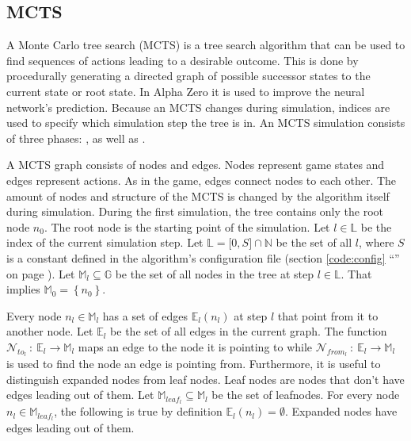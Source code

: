 \documentclass[12pt]{article}
\newcommand{\sectionref}[1]{section \ref{#1} ``\nameref{#1}'' on page \pageref{#1}}
\begin{document}
\subsection{MCTS \cite{chaslot2008parallel}\cite{silver2018general}}
A Monte Carlo tree search (MCTS) is a tree search algorithm that can be used to find sequences of actions leading to a desirable outcome. This is done by procedurally generating a directed graph of possible successor states to the current state or root state. In Alpha Zero it is used to improve the neural network's prediction.
Because an MCTS changes during simulation, indices are used to specify which simulation step the tree is in. An MCTS simulation consists of three phases: ,  as well as .

A MCTS graph consists of nodes and edges. Nodes represent game states and edges represent actions. As in the game, edges connect nodes to each other.
The amount of nodes and structure of the MCTS is changed by the algorithm itself during simulation. During the first simulation, the tree contains only the root node \(n_0\). The root node is the starting point of the simulation. Let \(l \in \mathbb L\) be the index of the current simulation step. Let \(\mathbb L = \mathbb [0, S]\cap\mathbb N\) be the set of all \(l\), where \(S\) is a constant defined in the algorithm's configuration file (\sectionref{code:config}). Let \(\mathbb{M}_l \subseteq \mathbb{G}\) be the set of all nodes in the tree at step \(l\in\mathbb L\). That implies \(\mathbb M_0 = \left\{n_0\right\}\).

 Every node \(n_l \in \mathbb{M}_l\) has a set of edges \(\mathbb{E}_l(n_l)\) at step \(l\) that point from it to another node. Let \(\mathbb{E}_l\) be the set of all edges in the current graph. The function \(\mathcal{N}_{to_l}~:~\mathbb{E}_{l}\to\mathbb{M}_l\) maps an edge to the node it is pointing to while \(\mathcal{N}_{from_l}~:~\mathbb{E}_{l}\to\mathbb{M}_l\) is used to find the node an edge is pointing from.
Furthermore, it is useful to distinguish expanded nodes from leaf nodes. Leaf nodes are nodes that don't have edges leading out of them. Let \(\mathbb{M}_{leaf_l} \subseteq \mathbb{M}_l\) be the set of leafnodes. For every node \(n_l\in \mathbb{M}_{leaf_l}\), the following is true by definition \(\mathbb{E}_l(n_l) = \emptyset\). Expanded nodes have edges leading out of them.

\begin{figure}[H]
  \centering
  
  \captionsetup{width=.9\linewidth}
  \caption{}
	\label{fig:mcts:example}
\end{figure}
\end{document}
